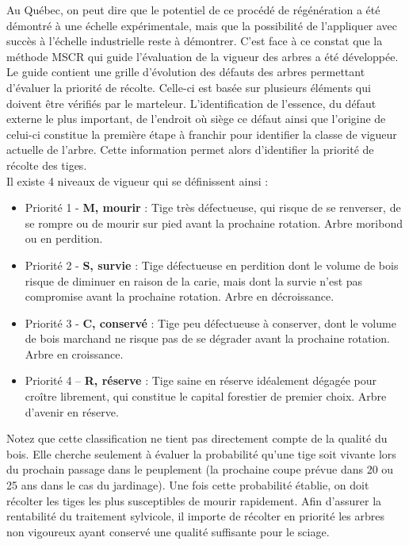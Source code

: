 Au Québec, on peut dire que le potentiel de ce procédé de régénération a été démontré à une échelle expérimentale, mais que la possibilité de l'appliquer avec succès à l'échelle industrielle reste à démontrer. C'est face à ce constat que la méthode MSCR qui guide l'évaluation de la vigueur des arbres a été développée.\\

Le guide contient une grille d'évolution des défauts des arbres permettant d'évaluer la priorité de récolte. Celle-ci est basée sur plusieurs éléments qui doivent être vérifiés par le marteleur. L'identification de l'essence, du défaut externe le plus important, de l'endroit où siège ce défaut ainsi que l'origine de celui-ci constitue la première étape à franchir pour identifier la classe de vigueur actuelle de l'arbre. Cette information permet alors d'identifier la priorité de récolte des tiges.\\

Il existe 4 niveaux de vigueur qui se définissent ainsi \citep{boulet2007defauts} :

\begin{itemize}
	\item Priorité 1 - \textbf{M, mourir} : Tige très défectueuse, qui risque de se renverser, de se rompre ou de mourir sur pied avant la prochaine rotation. Arbre moribond ou en perdition.
	\item Priorité 2 - \textbf{S, survie} : Tige défectueuse en perdition dont le volume de bois risque de diminuer en raison de la carie, mais dont la survie n'est pas compromise avant la prochaine rotation. Arbre en décroissance.
	\item Priorité 3 - \textbf{C, conservé} : Tige peu défectueuse à conserver, dont le volume de bois marchand ne risque pas de se dégrader avant la prochaine rotation. Arbre en croissance.
	\item Priorité 4 – \textbf{R, réserve }: Tige saine en réserve idéalement dégagée pour croître librement, qui constitue le capital forestier de premier choix. Arbre d'avenir en réserve.	
\end{itemize}

Notez que cette classification ne tient pas directement compte de la qualité du bois. Elle cherche seulement à évaluer la probabilité qu'une tige soit vivante lors du prochain passage dans le peuplement (la prochaine coupe prévue dans 20 ou 25 ans dans le cas du jardinage). Une fois cette probabilité établie, on doit récolter les tiges les plus susceptibles de mourir rapidement. Afin d'assurer la rentabilité du traitement sylvicole, il importe de récolter en priorité les arbres non vigoureux ayant conservé une qualité suffisante pour le sciage.\\

